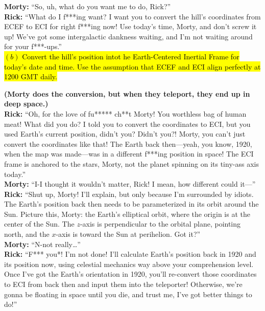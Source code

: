 \documentclass[a4paper, 12pt]{exam}
\begin{document}
\noindent \textbf{Morty:} “So, uh, what do you want me to do, Rick?”\\

\noindent \textbf{Rick:} “What do I f***ing want? I want you to convert the hill’s coordinates from ECEF to ECI for right f***ing now! Use today’s time, Morty, and don’t screw it up! We’ve got some intergalactic dankness waiting, and I’m not waiting around for your f***-ups.” \\

\hl{$(b)$ Convert the hill's position intot he Earth-Centered Inertial Frame for today's date and time. Use the assumption that ECEF and ECI align perfectly at 1200 GMT daily.}

\bigskip
\noindent \textbf{(Morty does the conversion, but when they teleport, they end up in deep space.)} \\

\noindent \textbf{Rick:} “Oh, for the love of fu***** ch**t Morty! You worthless bag of human meat! What did you do? I told you to convert the coordinates to ECI, but you used Earth’s current position, didn’t you? Didn’t you?! Morty, you can’t just convert the coordinates like that! The Earth back then—yeah, you know, 1920, when the map was made—was in a different f***ing position in space! The ECI frame is anchored to the stars, Morty, not the planet spinning on its tiny-ass axis today.”\\

\noindent \textbf{Morty:} “I-I thought it wouldn’t matter, Rick! I mean, how different could it—”\\

\noindent \textbf{Rick:} “Shut up, Morty! I’ll explain, but only because I’m surrounded by idiots. The Earth’s position back then needs to be parameterized in its orbit around the Sun. Picture this, Morty: the Earth’s elliptical orbit, where the origin is at the center of the Sun. The \( z \)-axis is perpendicular to the orbital plane, pointing north, and the \( x \)-axis is toward the Sun at perihelion. Got it?”\\

\noindent \textbf{Morty:} “N-not really…”\\

\noindent \textbf{Rick:} “F*** you*! I’m not done! I’ll calculate Earth’s position back in 1920 and its position now, using celestial mechanics way above your comprehension level. Once I’ve got the Earth’s orientation in 1920, you’ll re-convert those coordinates to ECI from back then and input them into the teleporter! Otherwise, we’re gonna be floating in space until you die, and trust me, I’ve got better things to do!”
\end{document}
